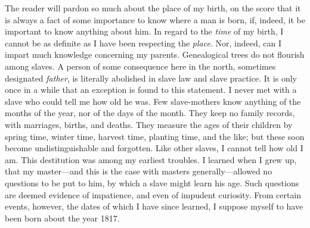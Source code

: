 The reader will pardon so much about the place of my birth, on the score
that it is always a fact of some importance to know where a man is born,
if, indeed, it be important to know anything about him. In regard to the
\emph{time} of my birth, I cannot be as definite as I have been
respecting the \emph{place}. Nor, indeed, can I impart much knowledge
concerning my parents. Genealogical trees do not flourish among slaves.
A person of some consequence here in the north,
{\protect\hypertarget{35}{}{}}sometimes designated \emph{father}, is
literally abolished in slave law and slave practice. It is only once in
a while that an exception is found to this statement. I never met with a
slave who could tell me how old he was. Few slave-mothers know anything
of the months of the year, nor of the days of the month. They keep no
family records, with marriages, births, and deaths. They measure the
ages of their children by spring time, winter time, harvest time,
planting time, and the like; but these soon become undistinguishable and
forgotten. Like other slaves, I cannot tell how old I am. This
destitution was among my earliest troubles. I learned when I grew up,
that my master---and this is the case with masters generally---allowed
no questions to be put to him, by which a slave might learn his age.
Such questions are deemed evidence of impatience, and even of impudent
curiosity. From certain events, however, the dates of which I have since
learned, I suppose myself to have been born about the year 1817.

